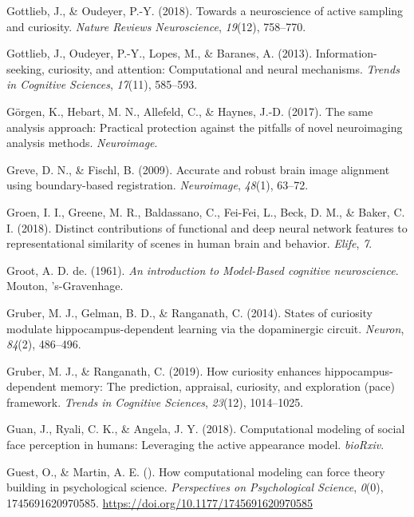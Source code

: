 \documentclass[11pt,american,a4paper,oneside,]{memoir} %
\begin{document}
\leavevmode\hypertarget{ref-gottlieb2018towards}{}%
Gottlieb, J., \& Oudeyer, P.-Y. (2018). Towards a neuroscience of active sampling and curiosity. \emph{Nature Reviews Neuroscience}, \emph{19}(12), 758--770.

\leavevmode\hypertarget{ref-gottlieb2013information}{}%
Gottlieb, J., Oudeyer, P.-Y., Lopes, M., \& Baranes, A. (2013). Information-seeking, curiosity, and attention: Computational and neural mechanisms. \emph{Trends in Cognitive Sciences}, \emph{17}(11), 585--593.

\leavevmode\hypertarget{ref-Gorgen2017-sy}{}%
Görgen, K., Hebart, M. N., Allefeld, C., \& Haynes, J.-D. (2017). The same analysis approach: Practical protection against the pitfalls of novel neuroimaging analysis methods. \emph{Neuroimage}.

\leavevmode\hypertarget{ref-Greve2009-da}{}%
Greve, D. N., \& Fischl, B. (2009). Accurate and robust brain image alignment using boundary-based registration. \emph{Neuroimage}, \emph{48}(1), 63--72.

\leavevmode\hypertarget{ref-Groen2018-qo}{}%
Groen, I. I., Greene, M. R., Baldassano, C., Fei-Fei, L., Beck, D. M., \& Baker, C. I. (2018). Distinct contributions of functional and deep neural network features to representational similarity of scenes in human brain and behavior. \emph{Elife}, \emph{7}.

\leavevmode\hypertarget{ref-degroot}{}%
Groot, A. D. de. (1961). \emph{An introduction to Model-Based cognitive neuroscience}. Mouton, 's-Gravenhage.

\leavevmode\hypertarget{ref-gruber2014states}{}%
Gruber, M. J., Gelman, B. D., \& Ranganath, C. (2014). States of curiosity modulate hippocampus-dependent learning via the dopaminergic circuit. \emph{Neuron}, \emph{84}(2), 486--496.

\leavevmode\hypertarget{ref-gruber2019curiosity}{}%
Gruber, M. J., \& Ranganath, C. (2019). How curiosity enhances hippocampus-dependent memory: The prediction, appraisal, curiosity, and exploration (pace) framework. \emph{Trends in Cognitive Sciences}, \emph{23}(12), 1014--1025.

\leavevmode\hypertarget{ref-Guan2018-hq}{}%
Guan, J., Ryali, C. K., \& Angela, J. Y. (2018). Computational modeling of social face perception in humans: Leveraging the active appearance model. \emph{bioRxiv}.

\leavevmode\hypertarget{ref-Guest2020-ef}{}%
Guest, O., \& Martin, A. E. (). How computational modeling can force theory building in psychological science. \emph{Perspectives on Psychological Science}, \emph{0}(0), 1745691620970585. \url{https://doi.org/10.1177/1745691620970585}
\end{document}
